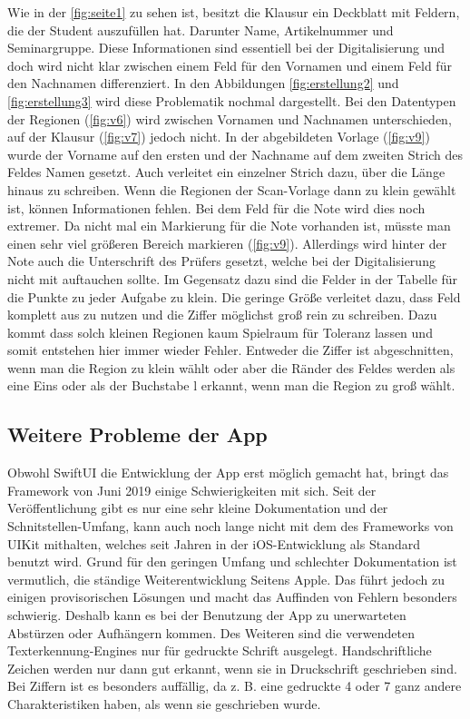 \documentclass[notables, nomenclature, oneside, 150]{HSMW-Thesis}
\begin{document}
			Wie in der \autoref{fig:seite1} zu sehen ist, besitzt die Klausur ein Deckblatt mit Feldern, die der Student auszufüllen hat. Darunter Name, Artikelnummer und Seminargruppe. Diese Informationen sind essentiell bei der Digitalisierung und doch wird nicht klar zwischen einem Feld für den Vornamen und einem Feld für den Nachnamen differenziert. In den Abbildungen \ref{fig:erstellung2} und \ref{fig:erstellung3} wird diese Problematik nochmal dargestellt. Bei den Datentypen der Regionen (\ref{fig:v6}) wird zwischen Vornamen und Nachnamen unterschieden, auf der Klausur (\ref{fig:v7}) jedoch nicht. In der abgebildeten Vorlage (\ref{fig:v9}) wurde der Vorname auf den ersten und der Nachname auf dem zweiten Strich des Feldes Namen gesetzt. Auch verleitet ein einzelner Strich dazu, über die Länge hinaus zu schreiben. Wenn die Regionen der Scan-Vorlage dann zu klein gewählt ist, können Informationen fehlen. Bei dem Feld für die Note wird dies noch extremer. Da nicht mal ein Markierung für die Note vorhanden ist, müsste man einen sehr viel größeren Bereich markieren (\ref{fig:v9}). Allerdings wird hinter der Note auch die Unterschrift des Prüfers gesetzt, welche bei der Digitalisierung nicht mit auftauchen sollte. Im Gegensatz dazu sind die Felder in der Tabelle für die Punkte zu jeder Aufgabe zu klein. Die geringe Größe verleitet dazu, dass Feld komplett aus zu nutzen und die Ziffer möglichst groß rein zu schreiben. Dazu kommt dass solch kleinen Regionen kaum Spielraum für Toleranz lassen und somit entstehen hier immer wieder Fehler. Entweder die Ziffer ist abgeschnitten, wenn man die Region zu klein wählt oder aber die Ränder des Feldes werden als eine Eins oder als der Buchstabe l erkannt, wenn man die Region zu groß wählt.

		\subsection{Weitere Probleme der App}
			Obwohl SwiftUI die Entwicklung der App erst möglich gemacht hat, bringt das Framework von Juni 2019 einige Schwierigkeiten mit sich. Seit der Veröffentlichung gibt es nur eine sehr kleine Dokumentation und der Schnitstellen-Umfang, kann auch noch lange nicht mit dem des Frameworks von UIKit mithalten, welches seit Jahren in der iOS-Entwicklung als Standard benutzt wird. Grund für den geringen Umfang und schlechter Dokumentation ist vermutlich, die ständige Weiterentwicklung Seitens Apple. Das führt jedoch zu einigen provisorischen Lösungen und macht das Auffinden von Fehlern besonders schwierig. Deshalb kann es bei der Benutzung der App zu unerwarteten Abstürzen oder Aufhängern kommen. Des Weiteren sind die verwendeten Texterkennung-Engines nur für gedruckte Schrift ausgelegt. Handschriftliche Zeichen werden nur dann gut erkannt, wenn sie in Druckschrift geschrieben sind. Bei Ziffern ist es besonders auffällig, da z. B. eine gedruckte 4 oder 7 ganz andere Charakteristiken haben, als wenn sie geschrieben wurde.
	
\end{document}
